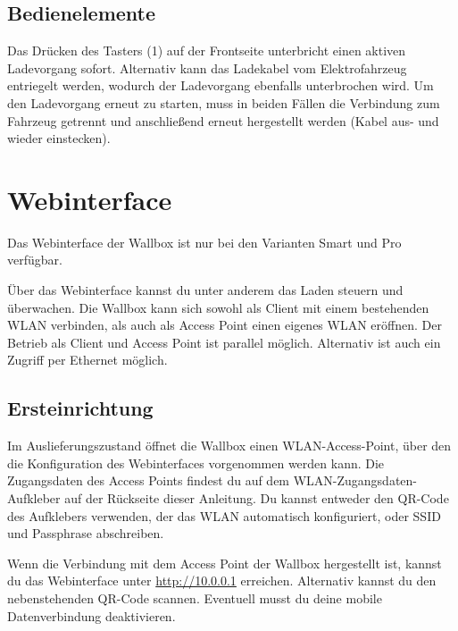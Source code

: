 \documentclass[a4paper,10pt]{article}
\begin{document}
\begin{multicols*}{2}
	\subsection{Bedienelemente}\label{lockswitch}
	Das Drücken des Tasters (1) auf der Frontseite unterbricht einen aktiven Ladevorgang
	sofort. Alternativ kann das Ladekabel vom Elektrofahrzeug entriegelt werden,
	wodurch der Ladevorgang ebenfalls unterbrochen wird. Um den Ladevorgang erneut
	zu starten, muss in beiden Fällen die Verbindung zum Fahrzeug getrennt und
	anschließend erneut hergestellt werden (Kabel aus- und wieder einstecken).

	\section{Webinterface}
	Das Webinterface der Wallbox ist nur bei den Varianten Smart und Pro verfügbar.

	\Blindtext %

	Über das Webinterface kannst du unter anderem das Laden steuern und überwachen.
	Die Wallbox kann sich sowohl als Client mit einem bestehenden WLAN verbinden,
	als auch als Access Point einen eigenes WLAN eröffnen. Der Betrieb als Client
	und Access Point ist parallel möglich. Alternativ ist auch ein Zugriff per
	Ethernet möglich.

	\subsection{Ersteinrichtung}
	Im Auslieferungszustand öffnet die Wallbox einen WLAN-Access-Point, über den
	die Konfiguration des Webinterfaces vorgenommen werden kann.
	Die Zugangsdaten des Access Points findest du auf dem WLAN-Zugangsdaten-Aufkleber
	auf der Rückseite dieser Anleitung. Du kannst entweder den QR-Code des Aufklebers verwenden,
	der das WLAN automatisch konfiguriert, oder SSID und Passphrase abschreiben.

	\begin{minipage}{0.35\textwidth}
		Wenn die Verbindung mit dem Access Point der Wallbox hergestellt ist, kannst du das Webinterface
		unter \url{http://10.0.0.1} erreichen. Alternativ kannst du den nebenstehenden QR-Code scannen.
		Eventuell musst du deine mobile Datenverbindung deaktivieren.
	\end{minipage}\hfill
	\begin{minipage}{0.12\textwidth}
		\begin{flushright}
		\end{flushright}
	\end{minipage}


\end{multicols*}
\end{document}
